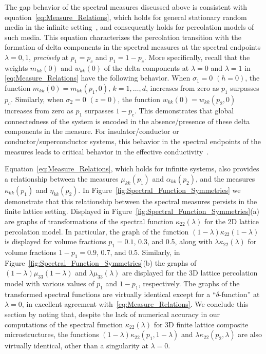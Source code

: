 \documentclass{cmslatex}
\begin{document}
The gap behavior of the spectral measures discussed above is
consistent with equation~\eqref{eq:Measure_Relations}, which holds for
general stationary random media in the infinite
setting~\cite{Murphy:JMP:063506}, and consequently holds for
percolation models of such media. This equation characterizes the percolation
transition with the formation of delta components in the spectral
measures at the spectral endpoints $\lambda=0,1$, \emph{precisely} at
$p_1=p_c$ and $p_1=1-p_c$. More specifically, recall that the weights
$m_{kk}(0)$ and $w_{kk}(0)$ of the delta components at
$\lambda=0$ and $\lambda=1$ in \eqref{eq:Measure_Relations} have the
following behavior. When $\sigma_1=0$ $(h=0)$, the function
$m_{kk}(0)=m_{kk}(p_1,0)$, $k=1,\ldots,d$, increases from zero as 
$p_1$ surpasses $p_c$. Similarly, when $\sigma_2=0$
$(z=0)$, the function $w_{kk}(0)=w_{kk}(p_2,0)$ increases from zero as
$p_1$ surpasses $1-p_c$. This demonstrates that global
connectedness of the system is encoded in the absence/presence of
these delta components in the measure. For insulator/conductor or
conductor/superconductor systems, this behavior in the spectral
endpoints of the measures leads to critical behavior in the effective
conductivity~\cite{Murphy:JMP:063506,Golden:JMP-5627}. 




Equation~\eqref{eq:Measure_Relations}, which holds for infinite
systems, also provides a relationship 
between the measures $\mu_{kk}(p_1)$ and $\alpha_{kk}(p_2)$, and the measures
$\kappa_{kk}(p_1)$ and $\eta_{kk}(p_2)$. In Figure~\ref{fig:Spectral_Function_Symmetries} we
demonstrate that this relationship between the spectral measures
persists in the finite lattice setting. Displayed in
Figure~\ref{fig:Spectral_Function_Symmetries}(a) are graphs of  
transformations of the spectral function $\kappa_{22}(\lambda)$ for the 2D
lattice percolation model. In particular,
the graph of the function $(1-\lambda)\kappa_{22}(1-\lambda)$ is displayed for
volume fractions $p_1=0.1$, 0.3, and 0.5, along with $\lambda\kappa_{22}(\lambda)$ for
volume fractions $1-p_1=0.9$, 0.7, and 0.5. Similarly, in
Figure~\ref{fig:Spectral_Function_Symmetries}(b) the graphs of 
$(1-\lambda)\mu_{33}(1-\lambda)$ and $\lambda\mu_{33}(\lambda)$ are displayed for the 3D lattice
percolation model with various values
of $p_1$ and $1-p_1$, respectively. The graphs of the 
transformed spectral functions are virtually identical except for a
``$\delta$-function'' at $\lambda=0$, in excellent agreement
with~\eqref{eq:Measure_Relations}. We conclude this section by noting
that, despite the lack of numerical accuracy in our computations of the
spectral function $\kappa_{22}(\lambda)$ for 3D finite lattice composite
microstructures, the functions $(1-\lambda)\kappa_{22}(p_1,1-\lambda)$ and
$\lambda\kappa_{22}(p_2,\lambda)$ are also virtually identical, other than a singularity
at $\lambda=0$. 
\end{document}
